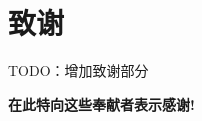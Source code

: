 \chapter{致谢}

TODO：增加致谢部分

\vspace{20pt}

\begin{center}
    \Large\textbf{在此特向这些奉献者表示感谢!}
\end{center}
